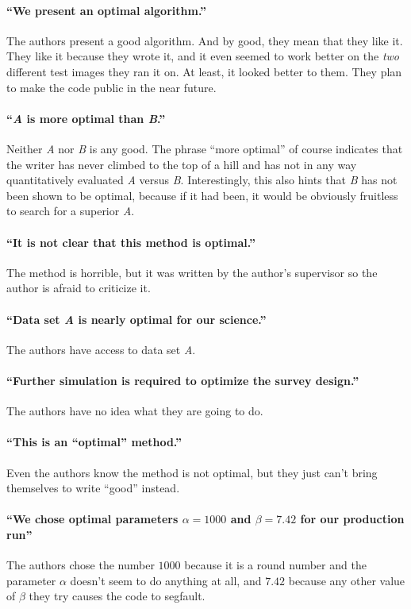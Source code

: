 \documentclass[12pt, preprint]{aastex}
\begin{document}
\paragraph{``We present an optimal algorithm.''}
The authors present a good algorithm.  And by good, they
mean that they like it.  They like it because they wrote it, and it
even seemed to work better on the \emph{two} different test images
they ran it on.  At least, it looked better to them.  They plan
to make the code public in the near future.

\paragraph{``\emph{A} is more optimal than \emph{B}.''}
Neither \emph{A} nor \emph{B} is any good.  The phrase ``more
optimal'' of course indicates that the writer has never climbed to the
top of a hill and has not in any way quantitatively evaluated \emph{A}
versus \emph{B}.  Interestingly, this also hints that \emph{B} has not
been shown to be optimal, because if it had been, it would be
obviously fruitless to search for a superior \emph{A}.

\paragraph{``It is not clear that this method is optimal.''}
The method is horrible, but it was written by the author's supervisor
so the author is afraid to criticize it.

\paragraph{``Data set \emph{A} is nearly optimal for our science.''}
The authors have access to data set \emph{A}.

\paragraph{``Further simulation is required to optimize the survey design.''}
The authors have no idea what they are going to do.

\paragraph{``This is an ``optimal'' method.''}
Even the authors know the method is not optimal, but they just can't bring
themselves to write ``good'' instead.

\paragraph{``We chose optimal parameters $\alpha=1000$ and $\beta=7.42$
  for our production run''} The authors chose the number $1000$ because
it is a round number and the parameter $\alpha$ doesn't seem to do
anything at all, and $7.42$ because any other value of $\beta$ they
try causes the code to segfault.
\end{document}
